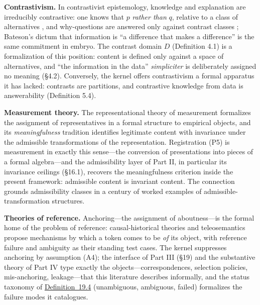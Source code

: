 \textbf{Contrastivism.} In contrastivist epistemology, knowledge and explanation are irreducibly contrastive: one knows that \(p\) \emph{rather than} \(q\), relative to a class of alternatives \autocite{schaffer2005}, and why-questions are answered only against contrast classes \autocite{vanfraassen1980}; Bateson's dictum that information is ``a difference that makes a difference'' \autocite{bateson1972} is the same commitment in embryo. The contrast domain \(D\) (Definition 4.1) is a formalization of this position: content is defined only against a space of alternatives, and ``the information in the data'' \emph{simpliciter} is deliberately assigned no meaning (§4.2). Conversely, the kernel offers contrastivism a formal apparatus it has lacked: contrasts are partitions, and contrastive knowledge from data is answerability (Definition 5.4).

\textbf{Measurement theory.} The representational theory of measurement \autocite{krantz1971} formalizes the assignment of representatives in a formal structure to empirical objects, and its \emph{meaningfulness} tradition \autocite{narens2002} identifies legitimate content with invariance under the admissible transformations of the representation. Registration (P5) is measurement in exactly this sense---\hspace{0pt}the conversion of presentations into pieces of a formal algebra---\hspace{0pt}and the admissibility layer of Part II, in particular its invariance ceilings (§16.1), recovers the meaningfulness criterion inside the present framework: admissible content is invariant content. The connection grounds admissibility classes in a century of worked examples of admissible-transformation structures.

\textbf{Theories of reference.} Anchoring---\hspace{0pt}the assignment of aboutness---\hspace{0pt}is the formal home of the problem of reference: causal-historical theories \autocite{kripke1980,putnam1975} and teleosemantics \autocite{millikan1984} propose mechanisms by which a token comes to be \emph{of} its object, with reference failure and ambiguity as their standing test cases. The kernel suppresses anchoring by assumption (A4); the interface of Part III (§19) and the substantive theory of Part IV type exactly the objects---\hspace{0pt}correspondences, selection policies, mis-anchoring, leakage---\hspace{0pt}that this literature describes informally, and the status taxonomy of \hyperlink{stmt:19.4}{Definition~19.4} (unambiguous, ambiguous, failed) formalizes the failure modes it catalogues.

